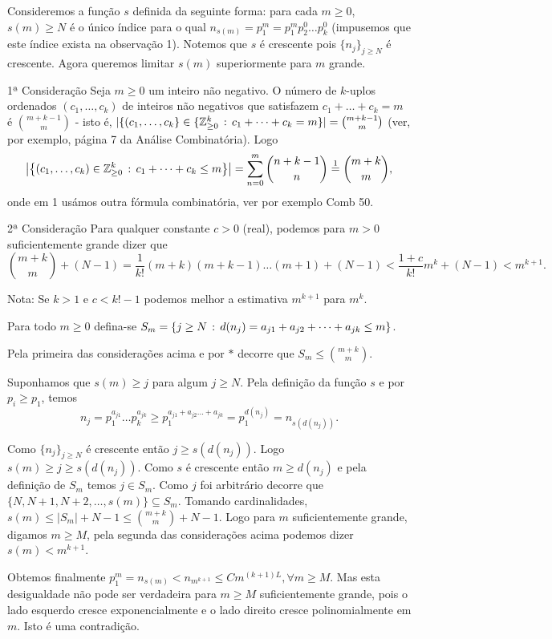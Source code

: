 \documentclass[repertorio-solutions-1.tex]{subfiles}
\newcommand*{\nj}{\ensuremath{\{n_j\}_{j\geq N}}}
\renewcommand*{\=}[1]{\ensuremath{\stackrel{\text{#1}}{=}}}
\begin{document}
\begin{solution}
Consideremos a função $s$ definida da seguinte forma:
para cada $m\geq 0$, $s(m)\geq N$ é o único índice para o qual
$n_{s(m)}=p_1^m=p_1^mp_2^0\dots p_k^0$
(impusemos que este índice exista na observação 1).
Notemos que $s$ é crescente pois $\nj$ é crescente.
Agora queremos limitar $s(m)$ superiormente para $m$ grande.

\begin{observation}{1ª Consideração}
Seja $m\geq 0$ um inteiro não negativo. O número de $k$-uplos ordenados
$(c_1,\dots,c_k)$ de inteiros não negativos que satisfazem
$c_1+\dots+c_k=m$ é $\binom{m+k-1}{m}$ - isto é,
$|\{(c_1,\dots,c_k\}\in\{\mathbb{Z}_{\geq 0}^k\,:\, c_1+\dots+c_k=m\}|
=\binom{m+k-1}{m}$
(ver, por exemplo, página 7 da Análise Combinatória).
Logo
\begin{equation*}
\left|\left\{(c_1,\dots,c_k)\in\mathbb{Z}_{\geq 0}^k\suchthat
c_1+\dots+c_k\leq m\right\}\right|
=\sum_{n=0}^m\binom{n+k-1}{n}\={1}\binom{m+k}{m},
\end{equation*}
onde em 1 usámos outra fórmula combinatória, ver por exemplo Comb 50.
\end{observation}

\begin{observation}{2ª Consideração}
Para qualquer constante $c>0$ (real), podemos para $m>0$ suficientemente
grande dizer que
\begin{equation*}
\binom{m+k}{m}+(N-1)=\frac{1}{k!}(m+k)(m+k-1)\dots(m+1)+(N-1)
<\frac{1+c}{k!}m^k+(N-1)<m^{k+1}.
\end{equation*}
\begin{footnotesize}
Nota: Se $k>1$ e $c<k!-1$ podemos melhor a estimativa $m^{k+1}$ para $m^k$.
\end{footnotesize}
\end{observation}

Para todo $m\geq 0$ defina-se
$S_m=\{j\geq N\,:\, d(n_j)=a_{j1}+a_{j2}+\dots+a_{jk}\leq m\}$.

Pela primeira das considerações acima e por $*$ decorre que
$S_m\leq\binom{m+k}{m}$.

Suponhamos que $s(m)\geq j$ para algum $j\geq N$.
Pela definição da função $s$ e por $p_i\geq p_1$, temos
\begin{equation*}
n_j=p_1^{a_{j1}}\dots p_k^{a_{jk}}
\geq p_1^{a_{j1}+a_{j2}\dots+a_{jk}}=p_1^{d(n_j)}=n_{s(d(n_j))}.
\end{equation*}

Como $\nj$ é crescente então $j\geq s(d(n_j))$.
Logo $s(m)\geq j\geq s(d(n_j))$.
Como $s$ é crescente então $m\geq d(n_j)$ e pela definição de $S_m$
temos $j\in S_m$.
Como $j$ foi arbitrário decorre que $\{N,N+1,N+2,\dots,s(m)\}\subseteq S_m$.
Tomando cardinalidades, $s(m)\leq |S_m|+N-1\leq\binom{m+k}{m}+N-1$.
Logo para $m$ suficientemente grande, digamos $m\geq M$,
pela segunda das considerações acima podemos dizer $s(m)<m^{k+1}$.

Obtemos finalmente $p_1^m=n_{s(m)}<n_{m^{k+1}}\leq Cm^{(k+1)L},\forall m\geq M$.
Mas esta desigualdade não pode ser verdadeira para $m\geq M$ suficientemente
grande, pois o lado esquerdo cresce exponencialmente e o lado direito
cresce polinomialmente em $m$. Isto é uma contradição.
\end{solution}
\end{document}
